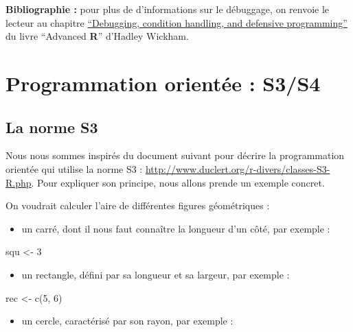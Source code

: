 \documentclass[
]{book}
\newenvironment{Shaded}{\begin{snugshade}}{\end{snugshade}}
\newcommand{\DecValTok}[1]{\textcolor[rgb]{0.00,0.00,0.81}{#1}}
\newcommand{\FunctionTok}[1]{\textcolor[rgb]{0.00,0.00,0.00}{#1}}
\newcommand{\NormalTok}[1]{#1}
\newcommand{\OtherTok}[1]{\textcolor[rgb]{0.56,0.35,0.01}{#1}}
\providecommand{\tightlist}{%
  \setlength{\itemsep}{0pt}\setlength{\parskip}{0pt}}
\theoremstyle{definition}
\theoremstyle{definition}
\theoremstyle{definition}
\theoremstyle{definition}
\theoremstyle{remark}
\begin{document}
\textbf{Bibliographie :} pour plus de d'informations sur le débuggage, on renvoie le lecteur au chapitre \href{http://adv-r.had.co.nz/Exceptions-Debugging.html}{``Debugging, condition handling, and defensive programming''} du livre ``Advanced \textbf{R}'' d'Hadley Wickham.

\hypertarget{programmation-orientuxe9e-s3s4}{%
\section{Programmation orientée : S3/S4}\label{programmation-orientuxe9e-s3s4}}

\hypertarget{la-norme-s3}{%
\subsection{La norme S3}\label{la-norme-s3}}

Nous nous sommes inspirés du document suivant pour décrire la programmation orientée qui utilise la norme S3 : \url{http://www.duclert.org/r-divers/classes-S3-R.php}. Pour expliquer son principe, nous allons prende un exemple concret.

On voudrait calculer l'aire de différentes figures géométriques :

\begin{itemize}
\tightlist
\item
  un carré, dont il nous faut connaître la longueur d'un côté, par exemple :
\end{itemize}

\begin{Shaded}
\begin{Highlighting}[]
\NormalTok{squ }\OtherTok{\textless{}{-}} \DecValTok{3}
\end{Highlighting}
\end{Shaded}

\begin{itemize}
\tightlist
\item
  un rectangle, défini par sa longueur et sa largeur, par exemple :
\end{itemize}

\begin{Shaded}
\begin{Highlighting}[]
\NormalTok{rec }\OtherTok{\textless{}{-}} \FunctionTok{c}\NormalTok{(}\DecValTok{5}\NormalTok{, }\DecValTok{6}\NormalTok{)}
\end{Highlighting}
\end{Shaded}

\begin{itemize}
\tightlist
\item
  un cercle, caractérisé par son rayon, par exemple :
\end{itemize}
\end{document}
